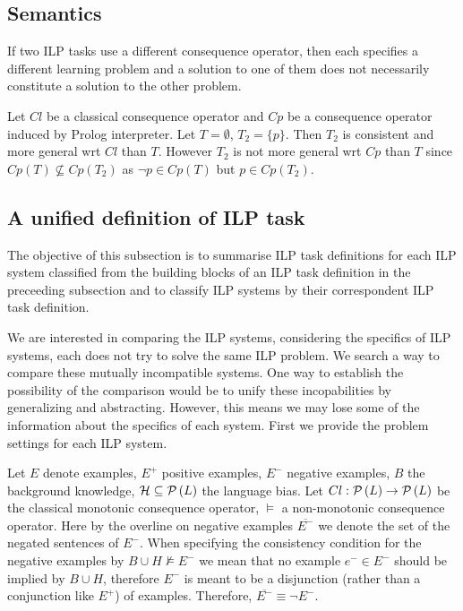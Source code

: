 \subsection{Semantics}
If two ILP tasks use a different consequence operator, then each specifies a different learning problem and a solution to one of them does not necessarily constitute a solution to the other problem.

\begin{exmp}
Let $Cl$ be a classical consequence operator and $Cp$ be a consequence operator induced by Prolog interpreter. Let $T=\emptyset$, $T_2=\{p\}$.
Then $T_2$ is consistent and more general wrt $Cl$ than $T$. However $T_2$ is not more general wrt $Cp$ than $T$ since $Cp(T) \not\subseteq Cp(T_2)$ as $\neg p \in Cp(T)$ but $p \in Cp(T_2)$.
\end{exmp}

\subsection{A unified definition of ILP task}
The objective of this subsection is to summarise ILP task definitions for each ILP system classified from the building blocks of an ILP task definition in the preceeding subsection  and to classify ILP systems by their correspondent ILP task definition.

We are interested in comparing the ILP systems, considering the specifics of ILP systems, each does not try to solve the same ILP problem. We search a way to compare these mutually incompatible systems. One way to establish the possibility of the comparison would be to unify these incopabilities by generalizing and abstracting. However, this means we may lose some of the information about the specifics of each system. First we provide the problem settings for each ILP system.

Let $E$ denote examples, $E^{+}$ positive examples, $E^{-}$ negative examples, $B$ the background knowledge, $\mathcal{H} \subseteq \mathcal{P} \left({ L }\right)$ the language bias. Let $Cl:\mathcal{P} \left({ L }\right) \to \mathcal{P} \left({ L }\right)$ be the classical monotonic consequence operator, $\models$ a non-monotonic consequence operator. Here by the overline on negative examples $\overline{E^{-}}$ we denote the set of the negated sentences of $E^{-}$. When specifying the consistency condition for the negative examples by $B \cup H \not\models E^{-}$ we mean that no example $e^{-} \in E^{-}$ should be implied by $B \cup H$, therefore $E^{-}$ is meant to be a disjunction (rather than a conjunction like $E^{+}$) of examples. Therefore, $\overline{E^{-}} \equiv \neg E^{-}$.

